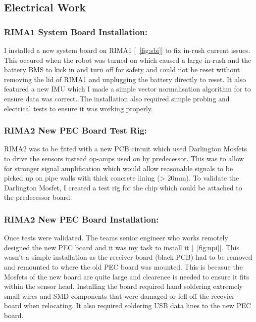 \subsection{Electrical Work}

\subsubsection{RIMA1 System Board Installation:}
I installed a new system board on RIMA1 [~\ref{fig:sbi}] to fix in-rush current issues. This occured when the robot was turned on which caused a large in-rush and the battery BMS to kick in and turn off for safety and could not be reset without removing the lid of RIMA1 and 
unplugging the battery directly to reset. It also featured a new IMU which I made a simple vector normalisation algorithm for to ensure data was correct. The installation also required simple probing and electrical tests
to ensure it was working properly. 


\subsubsection{RIMA2 New PEC Board Test Rig:}
RIMA2 was to be fitted with a new PCB circuit which used Darlington Mosfets to drive the sensors instead op-amps used on by predecessor. This was to allow for stronger signal amplification which would allow reasonable signals to 
be picked up on pipe walls with thick concrete lining (> 20mm). To validate the Darlington Mosfet, I created a test rig for the chip which could be attached to the predecessor board.



\newpage
\subsubsection{RIMA2 New PEC Board Installation:}
Once tests were validated. The teams senior engineer who works remotely designed the new PEC board and it was my task to install it [~\ref{fig:npi}]. This wasn't a simple installation as the receiver board (black PCB) had to be removed and remounted to 
where the old PEC board was mounted. This is becasue the Mosfets of the new board are quite large and clearence is needed to ensure it fits within the sensor head. Installing the board required 
hand soldering extremely small wires and SMD components that were damaged or fell off the recevier board when relocating. It also required soldering USB data lines to the new PEC board.

